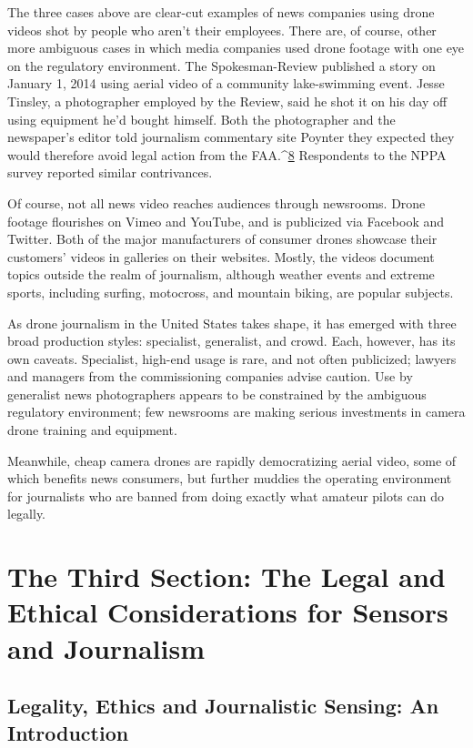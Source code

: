 The three cases above are clear-cut examples of news companies using drone
videos shot by people who aren't their employees. There are, of course, other
more ambiguous cases in which media companies used drone footage with
one eye on the regulatory environment. The Spokesman-Review published a
story on January 1, 2014 using aerial video of a community lake-swimming
event. Jesse Tinsley, a photographer employed by the Review, said he shot it
on his day off using equipment he'd bought himself. Both the photographer
and the newspaper's editor told journalism commentary site Poynter they
expected they would therefore avoid legal action from the FAA.^{\href{#endnotes-industry-overview}{8}} Respondents
to the NPPA survey reported similar contrivances.

Of course, not all news video reaches audiences through newsrooms. Drone
footage flourishes on Vimeo and YouTube, and is publicized via Facebook
and Twitter. Both of the major manufacturers of consumer drones showcase
their customers' videos in galleries on their websites. Mostly, the videos
document topics outside the realm of journalism, although weather
events and extreme sports, including surfing, motocross, and mountain
biking, are popular subjects.

As drone journalism in the United States takes shape, it has emerged with
three broad production styles: specialist, generalist, and crowd. Each,
however, has its own caveats. Specialist, high-end usage is rare, and not
often publicized; lawyers and managers from the commissioning companies
advise caution. Use by generalist news photographers appears to be
constrained by the ambiguous regulatory environment; few newsrooms are making serious investments in camera drone training and equipment.

Meanwhile, cheap camera drones are rapidly democratizing aerial video,
some of which benefits news consumers, but further muddies the operating
environment for journalists who are banned from doing exactly what amateur
pilots can do legally.

\part{The Third Section: The Legal and Ethical Considerations for Sensors and Journalism}


\chapter{Legality, Ethics and Journalistic Sensing: An Introduction}

